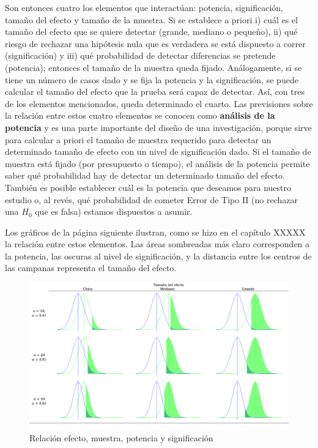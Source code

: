 \documentclass[]{book}
\begin{document}
Son entonces cuatro los elementos que interactúan: potencia,
significación, tamaño del efecto y tamaño de la muestra. Si se establece
a priori i) cuál es el tamaño del efecto que se quiere detectar (grande,
mediano o pequeño), ii) qué riesgo de rechazar una hipótesis nula que es
verdadera se está dispuesto a correr (significación) y iii) qué
probabilidad de detectar diferencias se pretende (potencia); entonces el
tamaño de la muestra queda fijado. Análogamente, si se tiene un número
de casos dado y se fija la potencia y la significación, se puede
calcular el tamaño del efecto que la prueba será capaz de detectar. Así,
con tres de los elementos mencionados, queda determinado el cuarto. Las
previsiones sobre la relación entre estos cuatro elementos se conocen
como \textbf{análisis de la potencia} y es una parte importante del diseño de
una investigación, porque sirve para calcular a priori el tamaño de
muestra requerido para detectar un determinado tamaño de efecto con un
nivel de significación dado. Si el tamaño de muestra está fijado (por
presupuesto o tiempo), el análisis de la potencia permite saber qué
probabilidad hay de detectar un determinado tamaño del efecto. También
es posible establecer cuál es la potencia que deseamos para nuestro
estudio o, al revés, qué probabilidad de cometer Error de Tipo II (no
rechazar una \(H_0\) que es falsa) estamos dispuestos a asumir.

Los gráficos de la página siguiente ilustran, como se hizo en el
capítulo XXXXX la relación entre estos elementos. Las áreas sombreadas más
claro corresponden a la potencia, las oscuras al nivel de significación,
y la distancia entre los centros de las campanas representa el tamaño
del efecto.

\begin{figure}

{\centering \includegraphics[width=24.89in]{imagenes/image213} 

}

\caption{Relación efecto, muestra, potencia y significación}\label{fig:unnamed-chunk-476}
\end{figure}
\end{document}
